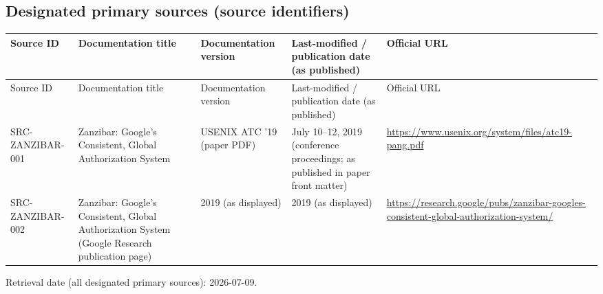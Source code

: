 \documentclass{article}
\begin{document}
\subsection*{Designated primary sources (source identifiers)}
\begin{longtable}{@{}p{}p{}p{}p{}p{}@{}}
\toprule
Source ID & Documentation title & Documentation version & Last-modified / publication date (as published) & Official URL\\
\midrule
\endfirsthead
\toprule
Source ID & Documentation title & Documentation version & Last-modified / publication date (as published) & Official URL\\
\midrule
\endhead
SRC-ZANZIBAR-001 & Zanzibar: Google’s Consistent, Global Authorization System & USENIX ATC '19 (paper PDF) & July 10--12, 2019 (conference proceedings; as published in paper front matter) & \url{https://www.usenix.org/system/files/atc19-pang.pdf}\\
SRC-ZANZIBAR-002 & Zanzibar: Google’s Consistent, Global Authorization System (Google Research publication page) & 2019 (as displayed) & 2019 (as displayed) & \url{https://research.google/pubs/zanzibar-googles-consistent-global-authorization-system/}\\
\bottomrule
\end{longtable}
Retrieval date (all designated primary sources): 2026-07-09.
\end{document}
